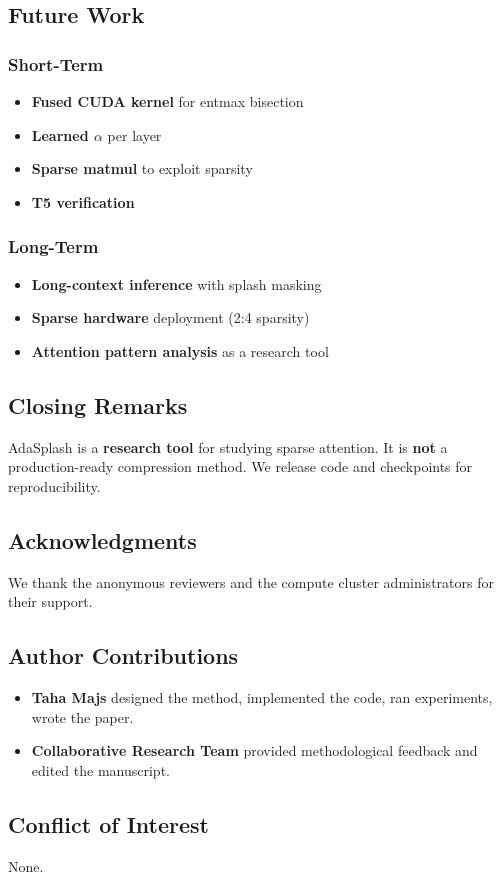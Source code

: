 \subsection{Future Work}

\subsubsection{Short-Term}
\begin{itemize}
\item \textbf{Fused CUDA kernel} for entmax bisection
\item \textbf{Learned $\alpha$} per layer
\item \textbf{Sparse matmul} to exploit sparsity
\item \textbf{T5 verification}

\end{itemize}
\subsubsection{Long-Term}
\begin{itemize}
\item \textbf{Long-context inference} with splash masking
\item \textbf{Sparse hardware} deployment (2:4 sparsity)
\item \textbf{Attention pattern analysis} as a research tool

\end{itemize}
\subsection{Closing Remarks}

AdaSplash is a \textbf{research tool} for studying sparse attention. It is 
\textbf{not} a production-ready compression method. We release code and checkpoints 
for reproducibility.

\subsection{Acknowledgments}

We thank the anonymous reviewers and the compute cluster administrators for their support.

\subsection{Author Contributions}

\begin{itemize}
\item \textbf{Taha Majs} designed the method, implemented the code, ran experiments,
  wrote the paper.
\item \textbf{Collaborative Research Team} provided methodological feedback and edited the manuscript.

\end{itemize}
\subsection{Conflict of Interest}

None.